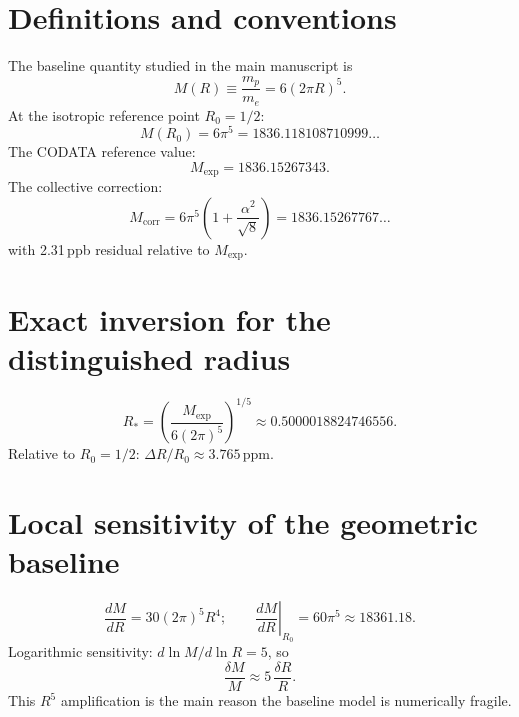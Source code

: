 \documentclass[11pt,a4paper]{article}
\begin{document}
\section{Definitions and conventions}
The baseline quantity studied in the main manuscript is
\begin{equation}\label{eq:base}
  M(R) \equiv \frac{m_p}{m_e} = 6(2\pi R)^5.
\end{equation}
At the isotropic reference point $R_0=1/2$:
\begin{equation}\label{eq:baseiso}
  M(R_0)=6\pi^5 = 1836.118108710999\ldots
\end{equation}
The CODATA reference value:
\begin{equation}\label{eq:codata}
  M_{\mathrm{exp}} = 1836.15267343.
\end{equation}
The collective correction:
\begin{equation}\label{eq:octcorr}
  M_{\mathrm{corr}} = 6\pi^5\!\left(1+\frac{\alpha^2}{\sqrt{8}}\right)
  = 1836.15267767\ldots
\end{equation}
with 2.31\,ppb residual relative to $M_{\mathrm{exp}}$.

\section{Exact inversion for the distinguished radius}
\begin{equation}\label{eq:rstar}
  R_* = \left(\frac{M_{\mathrm{exp}}}{6(2\pi)^5}\right)^{1/5}
  \approx 0.5000018824746556.
\end{equation}
Relative to $R_0=1/2$:
$\Delta R/R_0\approx 3.765\,\mathrm{ppm}$.

\section{Local sensitivity of the geometric baseline}
\begin{equation}
  \frac{dM}{dR} = 30(2\pi)^5 R^4;
  \qquad
  \left.\frac{dM}{dR}\right|_{R_0} = 60\pi^5 \approx 18361.18.
\end{equation}
Logarithmic sensitivity: $d\ln M/d\ln R=5$, so
\begin{equation}\label{eq:r5law}
  \frac{\delta M}{M} \approx 5\,\frac{\delta R}{R}.
\end{equation}
This $R^5$ amplification is the main reason the baseline model is numerically fragile.
\end{document}
